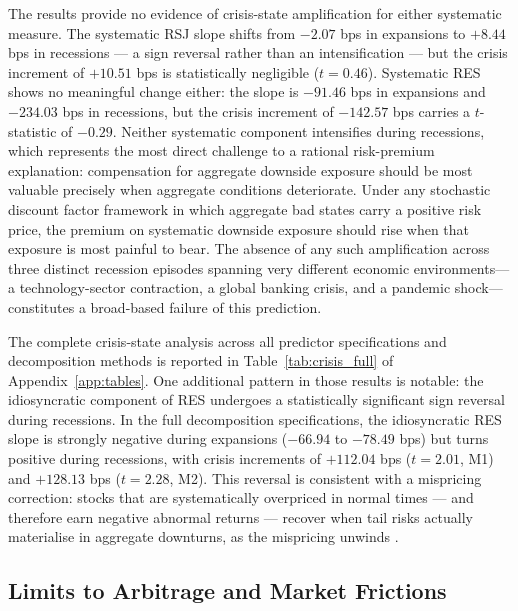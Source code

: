 \documentclass[11pt,a4paper]{article}
\begin{document}
The results provide no evidence of crisis-state amplification for either systematic
measure. The systematic RSJ slope shifts from $-2.07$ bps in expansions to $+8.44$ bps
in recessions --- a sign reversal rather than an intensification --- but the crisis
increment of $+10.51$ bps is statistically negligible ($t=0.46$). Systematic RES shows
no meaningful change either: the slope is $-91.46$ bps in expansions and $-234.03$ bps
in recessions, but the crisis increment of $-142.57$ bps carries a $t$-statistic of
$-0.29$. Neither systematic component intensifies during recessions, which represents
the most direct challenge to a rational risk-premium explanation: compensation for
aggregate downside exposure should be most valuable precisely when aggregate conditions
deteriorate. Under any stochastic discount factor framework in which aggregate bad states carry a
positive risk price, the premium on systematic downside exposure should rise when that
exposure is most painful to bear. The absence of any such amplification across three
distinct recession episodes spanning very different economic environments---a
technology-sector contraction, a global banking crisis, and a pandemic shock---constitutes
a broad-based failure of this prediction.

The complete crisis-state analysis across all predictor specifications and decomposition
methods is reported in Table~\ref{tab:crisis_full} of Appendix~\ref{app:tables}. One
additional pattern in those results is notable: the idiosyncratic component of RES
undergoes a statistically significant sign reversal during recessions. In the full
decomposition specifications, the idiosyncratic RES slope is strongly negative during
expansions ($-66.94$ to $-78.49$ bps) but turns positive during recessions, with crisis
increments of $+112.04$ bps ($t=2.01$, M1) and $+128.13$ bps ($t=2.28$, M2). This
reversal is consistent with a mispricing correction: stocks that are systematically
overpriced in normal times --- and therefore earn negative abnormal returns --- recover
when tail risks actually materialise in aggregate downturns, as the mispricing unwinds
\citep{atilgan2020}.

\FloatBarrier

\subsection{Limits to Arbitrage and Market Frictions}
\label{sec:frictions}
\end{document}
